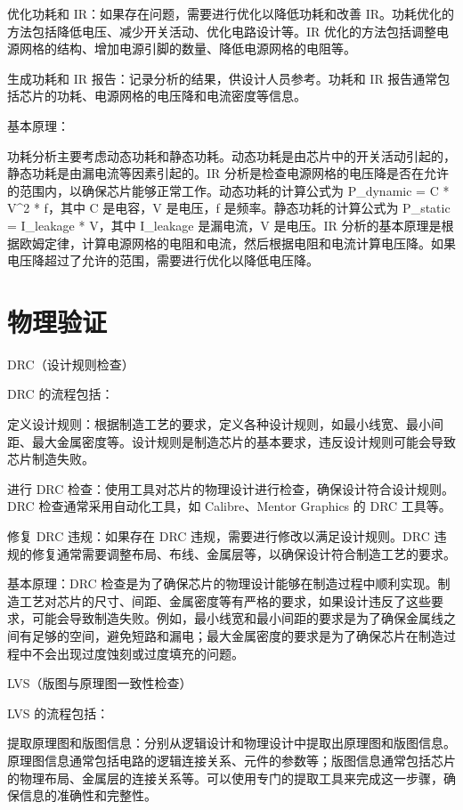 优化功耗和 IR：如果存在问题，需要进行优化以降低功耗和改善 IR。功耗优化的方法包括降低电压、减少开关活动、优化电路设计等。IR 优化的方法包括调整电源网格的结构、增加电源引脚的数量、降低电源网格的电阻等。

生成功耗和 IR 报告：记录分析的结果，供设计人员参考。功耗和 IR 报告通常包括芯片的功耗、电源网格的电压降和电流密度等信息。

基本原理：

功耗分析主要考虑动态功耗和静态功耗。动态功耗是由芯片中的开关活动引起的，静态功耗是由漏电流等因素引起的。IR 分析是检查电源网格的电压降是否在允许的范围内，以确保芯片能够正常工作。动态功耗的计算公式为 P\_dynamic = C * V\^{}2 * f，其中 C 是电容，V 是电压，f 是频率。静态功耗的计算公式为 P\_static = I\_leakage * V，其中 I\_leakage 是漏电流，V 是电压。IR 分析的基本原理是根据欧姆定律，计算电源网格的电阻和电流，然后根据电阻和电流计算电压降。如果电压降超过了允许的范围，需要进行优化以降低电压降。

\section{物理验证}\label{sec:17-chip-backend-012}

DRC（设计规则检查）

DRC 的流程包括：

定义设计规则：根据制造工艺的要求，定义各种设计规则，如最小线宽、最小间距、最大金属密度等。设计规则是制造芯片的基本要求，违反设计规则可能会导致芯片制造失败。

进行 DRC 检查：使用工具对芯片的物理设计进行检查，确保设计符合设计规则。DRC 检查通常采用自动化工具，如 Calibre、Mentor Graphics 的 DRC 工具等。

修复 DRC 违规：如果存在 DRC 违规，需要进行修改以满足设计规则。DRC 违规的修复通常需要调整布局、布线、金属层等，以确保设计符合制造工艺的要求。

基本原理：DRC 检查是为了确保芯片的物理设计能够在制造过程中顺利实现。制造工艺对芯片的尺寸、间距、金属密度等有严格的要求，如果设计违反了这些要求，可能会导致制造失败。例如，最小线宽和最小间距的要求是为了确保金属线之间有足够的空间，避免短路和漏电；最大金属密度的要求是为了确保芯片在制造过程中不会出现过度蚀刻或过度填充的问题。

LVS（版图与原理图一致性检查）

LVS 的流程包括：

提取原理图和版图信息：分别从逻辑设计和物理设计中提取出原理图和版图信息。原理图信息通常包括电路的逻辑连接关系、元件的参数等；版图信息通常包括芯片的物理布局、金属层的连接关系等。可以使用专门的提取工具来完成这一步骤，确保信息的准确性和完整性。

